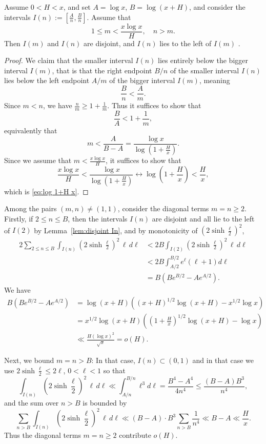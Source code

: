 \documentclass[12pt]{amsart}
\begin{document}
\begin{lem}\label{lem:disjoint In} 
Assume  $0 < H < x$,  and set $A = \log x$, $B =\log(x+H)$, and consider the intervals $I(n):=[\frac An,\frac Bn]$.    
Assume that 
$$1 \le m <  \frac{x\log x}{H}, \quad n>m.
$$  %
Then $I(m)$ and $I(n)$ are disjoint, and $I(n)$ lies to the left of $I(m)$ .
\end{lem}  
 \begin{proof}
We claim that  the smaller interval $I(n)$ lies entirely below the bigger interval $I(m)$, that is that  the right  endpoint $ B/n$ of the smaller interval $I(n)$  lies below the left endpoint $A/m$ of the bigger interval $I(m)$, 
meaning 
$$\frac Bn<\frac Am.
$$   
Since $m<n$, we have 
$\frac{n}{m}\ge 1+\frac{1}{m}$. 
Thus it suffices to show that
$$
\frac{B}{A}<1+\frac{1}{m},
$$
equivalently that 
$$
m<\frac{A}{B-A}= \frac{\log x}{ \log\left( 1+\frac Hx \right)} .
$$
Since we assume that $m<\frac{x\log x}{H}$, it suffices to show that 
\[
\frac {x\log x}H<\frac{\log x}{ \log\left( 1+\frac Hx \right)} \longleftrightarrow 
\log\left( 1+\frac Hx \right) <\frac Hx, 
\]
which  is \eqref{eq:log 1+H x}. 
\end{proof}



Among the pairs $(m,n)\neq (1,1)$, consider the diagonal terms $m=n\geq 2$.
Firstly, if $2\leq n\leq B$, then the intervals $I(n)$ are disjoint and all lie to the left of $I(2)$  by Lemma~\ref{lem:disjoint In},   and by monotonicity of $\left(2\sinh \frac \ell2 \right)^2$,  
\[
\begin{split}
2\sum_{2\leq n\leq B}  \int_{I(n)} \left(2\sinh \frac \ell2 \right)^2 \,\ell\, d\ell 
& < 
2B\int_{I(2)} \left(2\sinh \frac \ell2 \right)^2 \,\ell\, d\ell  
\\
&<2B\int_{A/2}^{B/2} e^\ell (\ell+1) d\ell 
\\
&= B\left( Be^{B/2}-Ae^{A/2}\right).
 \end{split}
\]
We have
\[
\begin{split}
B( Be^{B/2}-Ae^{A/2}) & = \log(x+H) \left(  (x+H)^{1/2}\log(x+H)-x^{1/2} \log x \right)
\\
& = x^{1/2}   \log(x+H)\left(  (1+\frac Hx)^{1/2}  \log(x+H) -\log x \right) 
\\
&\ll \frac{H (\log x)^2}{\sqrt{x}}  = o(H).
 \end{split}
\]




Next, we bound $m=n>B$: In that case, $I(n)\subset (0,1)$ and in that case we use $2\sinh \frac \ell 2\leq 2\ell$, $0<\ell<1$ so that 
\[
\int_{I(n)} \left( 2\sinh \frac \ell 2 \right)^2 \,\ell \,d \ell \ll \int_{A/n}^{B/n} \ell^3 d\ell = \frac{B^4-A^4}{4n^4}\leq \frac{(B-A) B^3}{n^4}, 
\] 
and the sum over $n>B$ is bounded by 
\[
\sum_{n>B} \int_{I(n)} \left( 2\sinh \frac \ell 2 \right)^2 \,\ell \,d \ell  \ll (B-A)  \cdot  B^3 \sum_{n>B} \frac 1{n^4} \ll 
B-A \ll \frac Hx.
\]
Thus the diagonal terms $m=n\geq 2$ contribute $o(H)$. 
\end{document}
